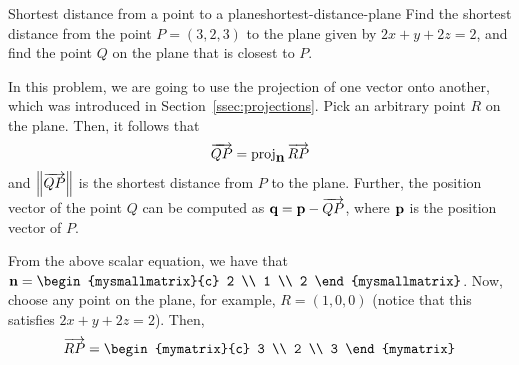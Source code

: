\begin{example}{Shortest distance from a point to a plane}{shortest-distance-plane}
  Find the shortest distance from the point $P = (3,2,3)$ to the plane
  given by $2x + y + 2z = 2$, and find the point $Q$ on the plane
  that is closest to $P$.%
\end{example}

\begin{solution}
  In this problem, we are going to use the projection of one vector
  onto another, which was introduced in
  Section~\ref{ssec:projections}.  Pick an arbitrary point $R$ on
  the plane. Then, it follows that
  \begin{equation*}
    \overrightarrow{QP} = \mbox{\rm proj}_{\mbox{\bf n}}\,\overrightarrow{RP}
  \end{equation*}
  and $\left\|\overrightarrow{QP}\right\|$ is the shortest distance from $P$ to the
  plane. Further, the position vector of the point $Q$ can be computed
  as $\mbox{\bf q} = \mbox{\bf p} - \overrightarrow{QP}$, where $\mbox{\bf p}$ is the
  position vector of $P$.
  \begin{center}
  \end{center}
  From the above scalar equation, we have that $\vect{n} =
  \begin{mysmallmatrix}{c} 2 \\ 1 \\ 2 \end{mysmallmatrix}$.  Now, choose any
  point on the plane, for example, $R = (1,0,0)$ (notice that this
  satisfies $2x+y+2z=2$).  Then,
  \begin{equation*}
    \longvect{RP} = \begin{mymatrix}{c} 3 \\ 2 \\ 3 \end{mymatrix}

\end{equation*}
\end{solution}
